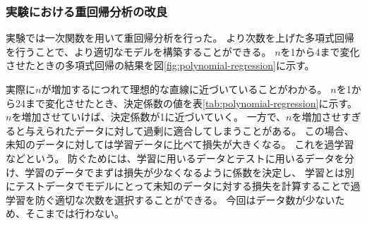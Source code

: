 \documentclass[../../../main]{subfiles}
\begin{document}
\subsubsection{実験における重回帰分析の改良}
実験では一次関数を用いて重回帰分析を行った。
より次数を上げた多項式回帰を行うことで、より適切なモデルを構築することができる。
$n$を1から4まで変化させたときの多項式回帰の結果を図\ref{fig:polynomial-regression}に示す。

実際に$n$が増加するにつれて理想的な直線に近づいていることがわかる。
$n$を1から24まで変化させたとき、決定係数の値を表\ref{tab:polynomial-regression}に示す。
$n$を増加させていけば、決定係数が1に近づいていく。
一方で、$n$を増加させすぎると与えられたデータに対して過剰に適合してしまうことがある。
この場合、未知のデータに対しては学習データに比べて損失が大きくなる。
これを過学習などという。
防ぐためには、学習に用いるデータとテストに用いるデータを分け、学習のデータでまずは損失が少なくなるように係数を決定し、
学習とは別にテストデータでモデルにとって未知のデータに対する損失を計算することで過学習を防ぐ適切な次数を選択することができる。
今回はデータ数が少ないため、そこまでは行わない。

\end{document}

